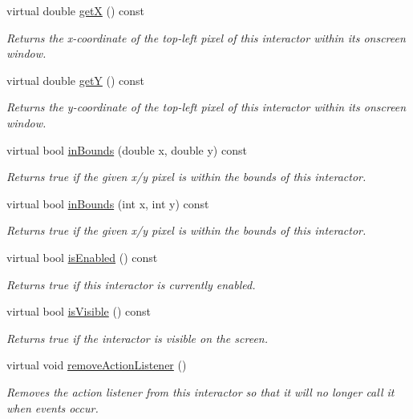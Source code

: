 \begin{DoxyCompactItemize}
virtual double \mbox{\hyperlink{classGInteractor_a344385751bee0720059403940d57a13e}{getX}} () const
\begin{DoxyCompactList}\small\item\em Returns the x-\/coordinate of the top-\/left pixel of this interactor within its onscreen window. \end{DoxyCompactList}\item 
virtual double \mbox{\hyperlink{classGInteractor_aafa51c7f8f38a09febbb9ce7853f77b4}{getY}} () const
\begin{DoxyCompactList}\small\item\em Returns the y-\/coordinate of the top-\/left pixel of this interactor within its onscreen window. \end{DoxyCompactList}\item 
virtual bool \mbox{\hyperlink{classGInteractor_afc480f652b8c5f1fb255e2269ce68879}{in\+Bounds}} (double x, double y) const
\begin{DoxyCompactList}\small\item\em Returns true if the given x/y pixel is within the bounds of this interactor. \end{DoxyCompactList}\item 
virtual bool \mbox{\hyperlink{classGInteractor_ae6d7982c1c627b677a5e776ca86118ed}{in\+Bounds}} (int x, int y) const
\begin{DoxyCompactList}\small\item\em Returns true if the given x/y pixel is within the bounds of this interactor. \end{DoxyCompactList}\item 
virtual bool \mbox{\hyperlink{classGInteractor_aacb819fb241851fd9fc045271baa4034}{is\+Enabled}} () const
\begin{DoxyCompactList}\small\item\em Returns true if this interactor is currently enabled. \end{DoxyCompactList}\item 
virtual bool \mbox{\hyperlink{classGInteractor_a9d8a6cfb13917785c143e74d40e4e2be}{is\+Visible}} () const
\begin{DoxyCompactList}\small\item\em Returns true if the interactor is visible on the screen. \end{DoxyCompactList}\item 
virtual void \mbox{\hyperlink{classGInteractor_ab7fe7a876367b87cf7202f947f1d05e4}{remove\+Action\+Listener}} ()
\begin{DoxyCompactList}\small\item\em Removes the action listener from this interactor so that it will no longer call it when events occur. \end{DoxyCompactList}\item 

\end{DoxyCompactItemize}
